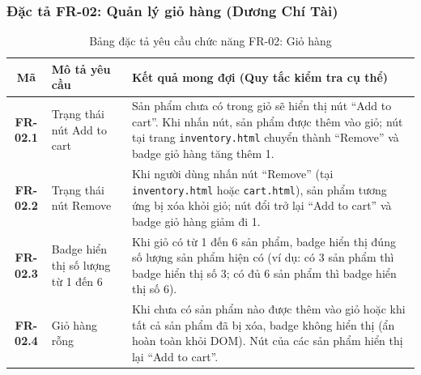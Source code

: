 \documentclass[a4paper]{article}
\begin{document}
\subsubsection{Đặc tả FR-02: Quản lý giỏ hàng (Dương Chí Tài)}
\begin{table}[H]
\centering
\small
\begin{tabularx}{\textwidth}{|c|p{4.5cm}|X|}
\hline
\textbf{Mã} & \textbf{Mô tả yêu cầu} & \textbf{Kết quả mong đợi (Quy tắc kiểm tra cụ thể)} \\ \hline
\textbf{FR-02.1} & Trạng thái nút Add to cart & Sản phẩm chưa có trong giỏ sẽ hiển thị nút ``Add to cart''. Khi nhấn nút, sản phẩm được thêm vào giỏ; nút tại trang \texttt{inventory.html} chuyển thành ``Remove'' và badge giỏ hàng tăng thêm 1. \\ \hline
\textbf{FR-02.2} & Trạng thái nút Remove & Khi người dùng nhấn nút ``Remove'' (tại \texttt{inventory.html} hoặc \texttt{cart.html}), sản phẩm tương ứng bị xóa khỏi giỏ; nút đổi trở lại ``Add to cart'' và badge giỏ hàng giảm đi 1. \\ \hline
\textbf{FR-02.3} & Badge hiển thị số lượng từ 1 đến 6 & Khi giỏ có từ 1 đến 6 sản phẩm, badge hiển thị đúng số lượng sản phẩm hiện có (ví dụ: có 3 sản phẩm thì badge hiển thị số 3; có đủ 6 sản phẩm thì badge hiển thị số 6). \\ \hline
\textbf{FR-02.4} & Giỏ hàng rỗng & Khi chưa có sản phẩm nào được thêm vào giỏ hoặc khi tất cả sản phẩm đã bị xóa, badge không hiển thị (ẩn hoàn toàn khỏi DOM). Nút của các sản phẩm hiển thị lại ``Add to cart''. \\ \hline
\end{tabularx}
\caption{Bảng đặc tả yêu cầu chức năng FR-02: Giỏ hàng}
\end{table}

\clearpage
\end{document}
